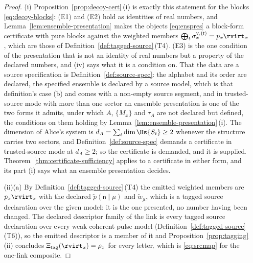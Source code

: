 \begin{proof}
(i) Proposition~\ref{prop:decoy-cert}\,(i) is exactly this statement for the
blocks \eqref{eq:decoy-blocks}: (E1) and (E2) hold as identities of real
numbers, and Lemma~\ref{lem:ensemble-presentation} makes the objects
\eqref{eq:enspres} a block-form certificate with pure blocks against the
weighted members $\bigoplus_t\sigma^{\mathrm v,(t)}_x=p_x\rvirt_x$, which are
those of Definition~\ref{def:tagged-source}\,(T4). (E3) is the one condition of the presentation that is not an
identity of real numbers but a property of the declared numbers, and (iv) says
what it is a condition on. That the data are a source specification is
Definition~\ref{def:source-spec}: the alphabet and its order are declared, the
specified ensemble is declared by a source model, which is that definition's
case (b) and comes with a non-empty source segment, and in trusted-source mode
with more than one sector an ensemble presentation is one of the two forms it
admits, under which $A$, $\{M_x\}$ and $\tau_A$ are not declared but defined,
the conditions on them holding by
Lemma~\ref{lem:ensemble-presentation}\,(i). The dimension of Alice's system is
$d_A=\sum_t\dim\Hs{S_t}\ge2$ whenever the structure carries two sectors, and
Definition~\ref{def:source-spec} demands a certificate in trusted-source mode
at $d_A\ge2$; so the certificate is demanded, and it is supplied. Theorem~\ref{thm:certificate-sufficiency} applies to a certificate in either form, and
its part (i) says what an ensemble presentation decides.

(ii)(a) By Definition~\ref{def:tagged-source}\,(T4) the emitted weighted
members are $p_x\rvirt_x$ with the declared
$\tilde p(\mathsf{n}\mid\mu)$ and $\tilde w_{\mu}$, which is a tagged source
declaration over the given model: it is the one presented, no number having
been changed. The declared descriptor family of the link is every tagged source
declaration over every weak-coherent-pulse model
(Definition~\ref{def:tagged-source}\,(T6)), so the emitted descriptor is a
member of it and Proposition~\ref{prop:tagging}\,(ii) concludes
$\Xi_{\mathrm{tag}}(\rvirt_x)=\rho_x$ for every letter, which is
\eqref{eq:srcmap} for the one-link composite.


\end{proof}
